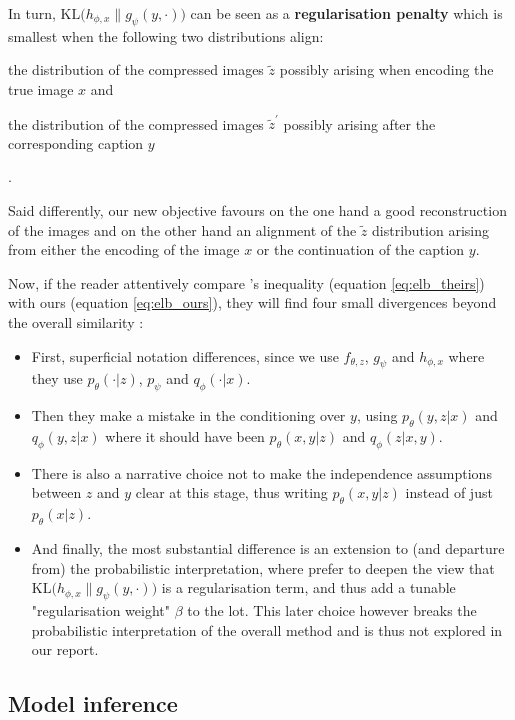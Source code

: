 \documentclass{article}
\begin{document}
\begin{multicols}{2}
In turn, $\textrm{KL}\Big( h_{\phi,x} \| g_\psi(y,\cdot) \Big)$ can be seen as a \textbf{regularisation penalty} which is smallest when the following two distributions align: \begin{enumerate*}[label=(\roman*)] \item the distribution of the compressed images $\tilde z$ possibly arising when encoding the true image $x$ and \item the distribution of the compressed images $\tilde z^\prime$ possibly arising after the corresponding caption $y$\end{enumerate*}.

Said differently, our new objective favours on the one hand a good reconstruction of the images and on the other hand an alignment of the $\tilde z$ distribution arising from either the encoding of the image $x$ or the continuation of the caption $y$.

Now, if the reader attentively compare \citeauthor{zeroshot}'s inequality (equation \ref{eq:elb_theirs}) with ours (equation \ref{eq:elb_ours}), they will find four small divergences beyond the overall similarity :

\begin{itemize}
    \item First, superficial notation differences, since we use $f_{\theta,z}$, $g_\psi$ and $h_{\phi,x}$ where they use $p_\theta(\cdot|z)$, $p_\psi$ and $q_\phi(\cdot|x)$.
    \item Then they make a mistake in the conditioning over $y$, using $p_\theta(y,z|x)$ and $q_\phi(y,z|x)$ where it should have been $p_\theta(x,y|z)$ and $q_\phi(z|x,y)$.
    \item There is also a narrative choice not to make the independence assumptions between $z$ and $y$ clear at this stage, thus writing $p_\theta(x,y|z)$ instead of just $p_\theta(x|z)$.
    \item And finally, the most substantial difference is an extension to (and departure from) the probabilistic interpretation, where \citeauthor{zeroshot} prefer to deepen the view that $\textrm{KL}\Big( h_{\phi,x} \| g_\psi(y,\cdot) \Big)$ is a regularisation term, and thus add a tunable "regularisation weight" $\beta$ to the lot. This later choice however breaks the probabilistic interpretation of the overall method and is thus not explored in our report.
\end{itemize}   

\subsection{Model inference} \label{sec:inference}


\end{multicols}
\end{document}
